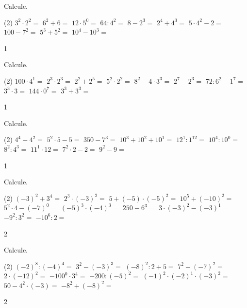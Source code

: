 \documentclass[a4paper,11pt]{report}
\begin{document}
\begin{exop}{%
Calcule.
\begin{tasks}(2)
    \task $3^2\cdot2^2=$
    \task $6^2+6=$
    \task $12\cdot5^0=$
    \task $64:4^2=$
    \task $8-2^3=$
    \task $2^4+4^3=$
    \task $5\cdot4^2-2=$
    \task $100-7^2=$
    \task $5^3+5^2=$
    \task $10^4-10^3=$
\end{tasks}
}{1}    
\end{exop}


\begin{exop}{%
Calcule.
\begin{tasks}(2)
    \task $100\cdot4^1=$
    \task $2^3\cdot2^3=$
    \task $2^2+2^5=$
    \task $5^2\cdot2^2=$
    \task $8^2-4\cdot3^3=$
    \task $2^7-2^3=$
    \task $72:6^2-1^7=$
    \task $3^3\cdot3=$
    \task $144\cdot0^7=$
    \task $3^3+3^3=$
\end{tasks}
}{1}    
\end{exop}

\begin{exop}{%
Calcule.
\begin{tasks}(2)
    \task $4^4+4^2=$
    \task $5^2\cdot5-5=$
    \task $350-7^3=$
    \task $10^3+10^2+10^1=$
    \task $12^1:1^{12}=$
    \task $10^4:10^0=$
    \task $8^2:4^3=$
    \task $11^1\cdot12=$
    \task $7^2\cdot2-2=$
    \task $9^2-9=$
\end{tasks}
}{1}    
\end{exop}




\begin{exop}{%
Calcule.
\begin{tasks}(2)
    \task $(-3)^2+3^4=$
    \task $2^3\cdot(-3)^2=$
    \task $5+(-5)\cdot(-5)^2=$
    \task $10^5+(-10)^2=$
    \task $5^2\cdot4-(-7)^0=$
    \task $(-5)^3\cdot(-4)^3=$
    \task $250-6^3=$
    \task $3\cdot(-3)^2-(-3)^1=$
    \task $-9^2:3^2=$
    \task $-10^6:2=$
\end{tasks}
}{2}    
\end{exop}

\begin{exop}{%
Calcule.
\begin{tasks}(2)
    \task $(-2)^8:(-4)^4=$
    \task $3^2-(-3)^3=$
    \task $(-8)^2:2+5=$
    \task $7^2-(-7)^2=$
    \task $2\cdot(-12)^2=$
    \task $-100^0\cdot3^4=$
    \task $-200:(-5)^2=$
    \task $(-1)^2\cdot(-2)^1\cdot(-3)^2=$
    \task $50-4^2\cdot(-3)=$
    \task $-8^2+(-8)^2=$
\end{tasks}
}{2}    
\end{exop}
\end{document}
